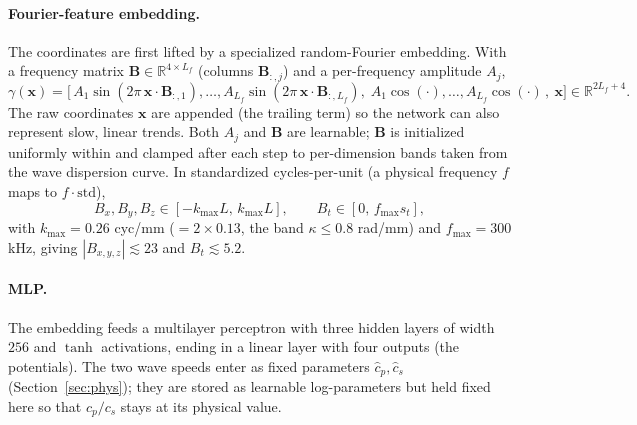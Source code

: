 \documentclass[11pt]{article}
\newcommand{\cph}{\hat{c}_p} \newcommand{\csh}{\hat{c}_s}
\begin{document}
\paragraph{Fourier-feature embedding.} The coordinates are first lifted by a
specialized random-Fourier embedding. With a frequency matrix
$\mathbf{B}\in\mathbb{R}^{4\times L_f}$ (columns $\mathbf{B}_{:,j}$) and a
per-frequency amplitude $A_j$,
\begin{equation}
\gamma(\mathbf{x}) = \Big[\,A_1\sin(2\pi\,\mathbf{x}\!\cdot\!\mathbf{B}_{:,1}),\dots,
A_{L_f}\sin(2\pi\,\mathbf{x}\!\cdot\!\mathbf{B}_{:,L_f}),\;
A_1\cos(\cdot),\dots,A_{L_f}\cos(\cdot)\,,\ \mathbf{x}\Big]\in\mathbb{R}^{2L_f+4}.
\label{eq:rff}
\end{equation}
The raw coordinates $\mathbf{x}$ are appended (the trailing term) so the network
can also represent slow, linear trends. Both $A_j$ and $\mathbf{B}$ are learnable;
$\mathbf{B}$ is initialized uniformly within and clamped after each step to
per-dimension bands taken from the wave dispersion curve. In standardized
cycles-per-unit (a physical frequency $f$ maps to $f\cdot\mathrm{std}$),
\begin{equation}
B_{x},B_{y},B_{z}\in[-k_{\max}L,\,k_{\max}L],\qquad B_{t}\in[0,\,f_{\max}s_t],
\end{equation}
with $k_{\max}=0.26$ cyc/mm ($=2\times0.13$, the band $\kappa\!\le\!0.8$ rad/mm)
and $f_{\max}=300$ kHz, giving $|B_{x,y,z}|\!\lesssim\!23$ and $B_t\!\lesssim\!5.2$.

\paragraph{MLP.} The embedding feeds a multilayer perceptron with three hidden
layers of width $256$ and $\tanh$ activations, ending in a linear layer with four
outputs (the potentials). The two wave speeds enter as fixed parameters
$\cph,\csh$ (Section~\ref{sec:phys}); they are stored as learnable
log-parameters but held fixed here so that $c_p/c_s$ stays at its physical value.
\end{document}
